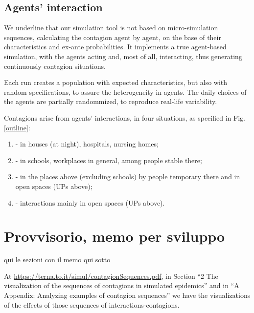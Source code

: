 \documentclass[graybox]{svmult}
\begin{document}
\subsection{Agents' interaction}
\label{inter}

We underline that our simulation tool is not based on micro-simulation sequences, calculating the contagion agent by agent, on the base of their characteristics and ex-ante probabilities. It implements a true agent-based simulation, with the agents acting and, most of all, interacting, thus generating continuously contagion situations.

Each run creates a population with expected characteristics, but also with random specifications, to assure the heterogeneity in agents. The daily choices of the agents are partially randommized, to reproduce real-life variability.

Contagions arise from agents' interactions, in four situations, as specified in Fig. \ref{outline}:

\begin{enumerate}[label=\Alph*]

\item - in houses (at night), hospitals, nursing homes;

\item - in schools, workplaces in general, among people stable there;

\item - in the places above (excluding schools) by people temporary there and in open spaces (UPs above);

\item - interactions mainly in open spaces (UPs above).

\end{enumerate}

\section{Provvisorio, memo per sviluppo}

qui le sezioni con il memo qui sotto

At \url{https://terna.to.it/simul/contagionSequences.pdf}, in Section ``2 The visualization of the sequences of contagions in simulated epidemics'' and in ``A Appendix: Analyzing examples of contagion sequences'' we have the visualizations of the effects of those sequences of interactions-contagions.
\end{document}
